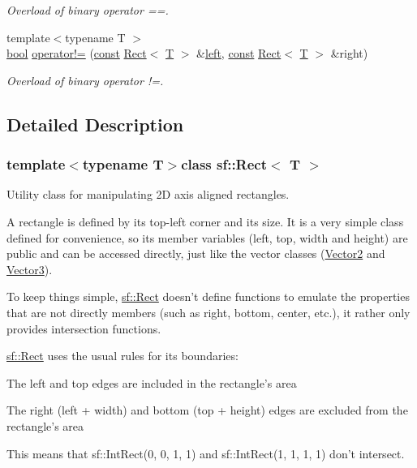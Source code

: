 \begin{DoxyCompactItemize}
\begin{DoxyCompactList}\small\item\em Overload of binary operator ==. \end{DoxyCompactList}\item 
{\footnotesize template$<$typename T $>$ }\\\hyperlink{term__entry_8h_a002004ba5d663f149f6c38064926abac}{bool} \hyperlink{classsf_1_1_rect_a03fc4c105687b7d0f07b6b4ed4b45581}{operator!=} (\hyperlink{term__entry_8h_a57bd63ce7f9a353488880e3de6692d5a}{const} \hyperlink{classsf_1_1_rect}{Rect}$<$ \hyperlink{curses_8priv_8h_a5ef253115820acf7d27f3c5c3b02a0f0}{T} $>$ \&\hyperlink{classsf_1_1_rect_aa49960fa465103d9cb7069ceb25c7c32}{left}, \hyperlink{term__entry_8h_a57bd63ce7f9a353488880e3de6692d5a}{const} \hyperlink{classsf_1_1_rect}{Rect}$<$ \hyperlink{curses_8priv_8h_a5ef253115820acf7d27f3c5c3b02a0f0}{T} $>$ \&right)
\begin{DoxyCompactList}\small\item\em Overload of binary operator !=. \end{DoxyCompactList}\end{DoxyCompactItemize}


\subsection{Detailed Description}
\subsubsection*{template$<$typename T$>$class sf\-::\-Rect$<$ T $>$}

Utility class for manipulating 2\-D axis aligned rectangles. 

A rectangle is defined by its top-\/left corner and its size. It is a very simple class defined for convenience, so its member variables (left, top, width and height) are public and can be accessed directly, just like the vector classes (\hyperlink{classsf_1_1_vector2}{Vector2} and \hyperlink{classsf_1_1_vector3}{Vector3}).

To keep things simple, \hyperlink{classsf_1_1_rect}{sf\-::\-Rect} doesn't define functions to emulate the properties that are not directly members (such as right, bottom, center, etc.), it rather only provides intersection functions.

\hyperlink{classsf_1_1_rect}{sf\-::\-Rect} uses the usual rules for its boundaries\-: \begin{DoxyItemize}
\item The left and top edges are included in the rectangle's area \item The right (left + width) and bottom (top + height) edges are excluded from the rectangle's area\end{DoxyItemize}
This means that sf\-::\-Int\-Rect(0, 0, 1, 1) and sf\-::\-Int\-Rect(1, 1, 1, 1) don't intersect.

